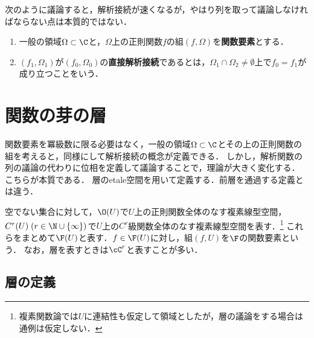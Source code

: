 \documentclass[uplatex, dvipdfmx]{jsreport}
\begin{document}
\begin{remark}
    次のように議論すると，解析接続が速くなるが，やはり列を取って議論しなければならない点は本質的ではない．
    \begin{enumerate}
        \item 一般の領域$\Omega\subset\C$と，$\Omega$上の正則関数$f$の組$(f,\Omega)$を\textbf{関数要素}とする．
        \item $(f_1,\Omega_1)$が$(f_0,\Omega_0)$の\textbf{直接解析接続}であるとは，$\Omega_1\cap\Omega_2\ne\emptyset$上で$f_0=f_1$が成り立つことをいう．
    \end{enumerate}
\end{remark}

\section{関数の芽の層}

\begin{tcolorbox}[colframe=ForestGreen, colback=ForestGreen!10!white,breakable,colbacktitle=ForestGreen!40!white,coltitle=black,fonttitle=\bfseries\sffamily,
title=岡潔の霊性]
    関数要素を冪級数に限る必要はなく，一般の領域$\Omega\subset\C$とその上の正則関数の組を考えると，同様にして解析接続の概念が定義できる．
    しかし，解析関数の列の議論の代わりに位相を定義して議論することで，理論が大きく変化する．
    こちらが本質である．
    層のetale空間を用いて定義する．前層を通過する定義とは違う．
\end{tcolorbox}

\begin{notation}
    空でない集合に対して，$\O(U)$で$U$上の正則関数全体のなす複素線型空間，$C^r(U)\;(r\in\N\cup\{\infty\})$で$U$上の$C^r$級関数全体のなす複素線型空間を表す．\footnote{複素関数論では$U$に連結性も仮定して領域としたが，層の議論をする場合は通例は仮定しない．}
    これらをまとめて$\F(U)$と表す．$f\in\F(U)$に対し，組$(f,U)$を$\F$の関数要素という．
    なお，層を表すときは$\cC^r$と表すことが多い．
\end{notation}

\subsection{層の定義}
\end{document}

